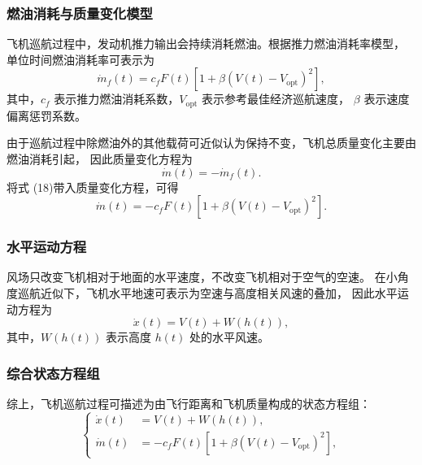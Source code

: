 \documentclass[withoutpreface,bwprint]{cumcmthesis} %
\begin{document}
\subsubsection{燃油消耗与质量变化模型}
飞机巡航过程中，发动机推力输出会持续消耗燃油。根据推力燃油消耗率模型，
单位时间燃油消耗率可表示为
\begin{equation}
    \dot m_f(t)
    =
    c_fF(t)
    \left[
    1+\beta\left(V(t)-V_{\mathrm{opt}}\right)^2
    \right],
    \label{eq:fuel_rate}
\end{equation}
其中，$c_f$ 表示推力燃油消耗系数，$V_{\mathrm{opt}}$ 表示参考最佳经济巡航速度，
$\beta$ 表示速度偏离惩罚系数。

由于巡航过程中除燃油外的其他载荷可近似认为保持不变，飞机总质量变化主要由燃油消耗引起，
因此质量变化方程为
\begin{equation}
    \dot m(t)=-\dot m_f(t).
    \label{eq:mass_change}
\end{equation}
将式 (18)带入质量变化方程，可得
\begin{equation}
    \dot m(t)
    =
    -c_fF(t)
    \left[
    1+\beta\left(V(t)-V_{\mathrm{opt}}\right)^2
    \right].
    \label{eq:mass_ode}
\end{equation}

\subsubsection{水平运动方程}

风场只改变飞机相对于地面的水平速度，不改变飞机相对于空气的空速。
在小角度巡航近似下，飞机水平地速可表示为空速与高度相关风速的叠加，
因此水平运动方程为\cite{8}
\begin{equation}
    \dot x(t)=V(t)+W(h(t)),
    \label{eq:x_ode}
\end{equation}
其中，$W(h(t))$ 表示高度 $h(t)$ 处的水平风速。

\subsubsection{综合状态方程组}

综上，飞机巡航过程可描述为由飞行距离和飞机质量构成的状态方程组：
\begin{equation}
\left\{
\begin{aligned}
    \dot x(t) &= V(t)+W(h(t)),\\
    \dot m(t) &=
    -c_fF(t)
    \left[
    1+\beta\left(V(t)-V_{\mathrm{opt}}\right)^2
    \right],
\end{aligned}
\right.
\label{eq:state_system}
\end{equation}
\end{document}
